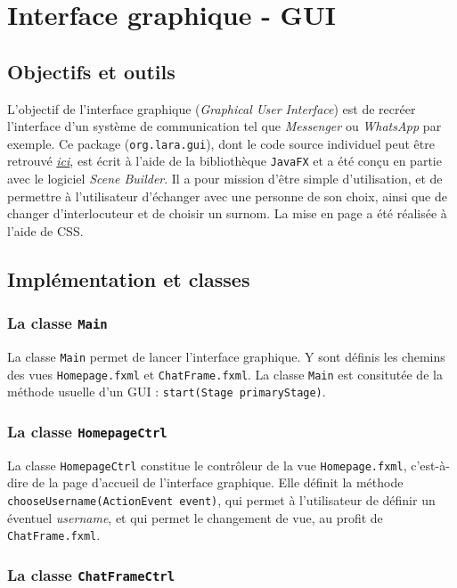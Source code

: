 \documentclass[10pt,a4paper]{article}
\begin{document}
\section{Interface graphique - GUI}
\subsection{Objectifs et outils}

L'objectif de l'interface graphique (\textit{Graphical User Interface}) est de recréer l'interface d'un système de communication tel que \textit{Messenger} ou \textit{WhatsApp} par exemple. Ce package (\texttt{org.lara.gui}), dont le code source individuel peut être retrouvé \href{https://github.com/LaraProject/GUI}{\textit{ici}}, est écrit à l'aide de la bibliothèque \texttt{JavaFX} et a été conçu en partie avec le logiciel \textit{Scene Builder}. Il a pour mission d'être simple d'utilisation, et de permettre à l'utilisateur d'échanger avec une personne de son choix, ainsi que de changer d'interlocuteur et de choisir un surnom. La mise en page a été réalisée à l'aide de CSS.

\subsection{Implémentation et classes}
\subsubsection{La classe \texttt{Main}}

La classe \texttt{Main} permet de lancer l'interface graphique. Y sont définis les chemins des vues \texttt{Homepage.fxml} et \texttt{ChatFrame.fxml}. La classe \texttt{Main} est consitutée de la méthode usuelle d'un GUI : \texttt{start(Stage primaryStage)}.

\subsubsection{La classe \texttt{HomepageCtrl}}

La classe \texttt{HomepageCtrl} constitue le contrôleur de la vue \texttt{Homepage.fxml}, c'est-à-dire de la page d'accueil de l'interface graphique. Elle définit la méthode \texttt{chooseUsername(ActionEvent event)}, qui permet à l'utilisateur de définir un éventuel \textit{username}, et qui permet le changement de vue, au profit de \texttt{ChatFrame.fxml}.

\subsubsection{La classe \texttt{ChatFrameCtrl}}
\end{document}
